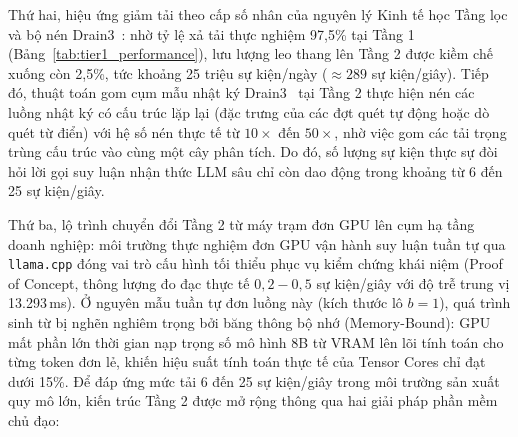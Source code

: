 Thứ hai, hiệu ứng giảm tải theo cấp số nhân của nguyên lý Kinh tế học Tầng lọc và bộ nén Drain3~\cite{he2017drain}: nhờ tỷ lệ xả tải thực nghiệm 97,5\% tại Tầng 1 (Bảng~\ref{tab:tier1_performance}), lưu lượng leo thang lên Tầng 2 được kiềm chế xuống còn 2,5\%, tức khoảng 25 triệu sự kiện/ngày ($\approx 289$ sự kiện/giây). Tiếp đó, thuật toán gom cụm mẫu nhật ký Drain3~\cite{he2017drain} tại Tầng 2 thực hiện nén các luồng nhật ký có cấu trúc lặp lại (đặc trưng của các đợt quét tự động hoặc dò quét từ điển) với hệ số nén thực tế từ $10\times$ đến $50\times$, nhờ việc gom các tải trọng trùng cấu trúc vào cùng một cây phân tích. Do đó, số lượng sự kiện thực sự đòi hỏi lời gọi suy luận nhận thức LLM sâu chỉ còn dao động trong khoảng từ 6 đến 25 sự kiện/giây.

Thứ ba, lộ trình chuyển đổi Tầng 2 từ máy trạm đơn GPU lên cụm hạ tầng doanh nghiệp: môi trường thực nghiệm đơn GPU vận hành suy luận tuần tự qua \texttt{llama.cpp} đóng vai trò cấu hình tối thiểu phục vụ kiểm chứng khái niệm (Proof of Concept, thông lượng đo đạc thực tế $0,2 - 0,5$ sự kiện/giây với độ trễ trung vị 13.293\,ms). Ở nguyên mẫu tuần tự đơn luồng này (kích thước lô $b=1$), quá trình sinh từ bị nghẽn nghiêm trọng bởi băng thông bộ nhớ (Memory-Bound): GPU mất phần lớn thời gian nạp trọng số mô hình 8B từ VRAM lên lõi tính toán cho từng token đơn lẻ, khiến hiệu suất tính toán thực tế của Tensor Cores chỉ đạt dưới 15\%. Để đáp ứng mức tải 6 đến 25 sự kiện/giây trong môi trường sản xuất quy mô lớn, kiến trúc Tầng 2 được mở rộng thông qua hai giải pháp phần mềm chủ đạo:
